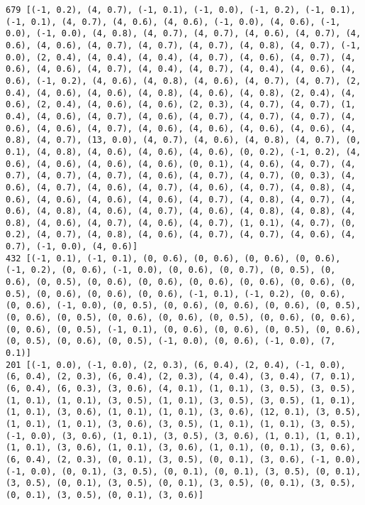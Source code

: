 \documentclass[11pt]{article}
\begin{document}
\begin{Verbatim}[commandchars=\\\{\}]
679 [(-1, 0.2), (4, 0.7), (-1, 0.1), (-1, 0.0), (-1, 0.2), (-1, 0.1), (-1, 0.1), (4, 0.7), (4, 0.6), (4, 0.6), (-1, 0.0), (4, 0.6), (-1, 0.0), (-1, 0.0), (4, 0.8), (4, 0.7), (4, 0.7), (4, 0.6), (4, 0.7), (4, 0.6), (4, 0.6), (4, 0.7), (4, 0.7), (4, 0.7), (4, 0.8), (4, 0.7), (-1, 0.0), (2, 0.4), (4, 0.4), (4, 0.4), (4, 0.7), (4, 0.6), (4, 0.7), (4, 0.6), (4, 0.6), (4, 0.7), (4, 0.4), (4, 0.7), (4, 0.4), (4, 0.6), (4, 0.6), (-1, 0.2), (4, 0.6), (4, 0.8), (4, 0.6), (4, 0.7), (4, 0.7), (2, 0.4), (4, 0.6), (4, 0.6), (4, 0.8), (4, 0.6), (4, 0.8), (2, 0.4), (4, 0.6), (2, 0.4), (4, 0.6), (4, 0.6), (2, 0.3), (4, 0.7), (4, 0.7), (1, 0.4), (4, 0.6), (4, 0.7), (4, 0.6), (4, 0.7), (4, 0.7), (4, 0.7), (4, 0.6), (4, 0.6), (4, 0.7), (4, 0.6), (4, 0.6), (4, 0.6), (4, 0.6), (4, 0.8), (4, 0.7), (13, 0.0), (4, 0.7), (4, 0.6), (4, 0.8), (4, 0.7), (0, 0.1), (4, 0.8), (4, 0.6), (4, 0.6), (4, 0.6), (0, 0.2), (-1, 0.2), (4, 0.6), (4, 0.6), (4, 0.6), (4, 0.6), (0, 0.1), (4, 0.6), (4, 0.7), (4, 0.7), (4, 0.7), (4, 0.7), (4, 0.6), (4, 0.7), (4, 0.7), (0, 0.3), (4, 0.6), (4, 0.7), (4, 0.6), (4, 0.7), (4, 0.6), (4, 0.7), (4, 0.8), (4, 0.6), (4, 0.6), (4, 0.6), (4, 0.6), (4, 0.7), (4, 0.8), (4, 0.7), (4, 0.6), (4, 0.8), (4, 0.6), (4, 0.7), (4, 0.6), (4, 0.8), (4, 0.8), (4, 0.8), (4, 0.6), (4, 0.7), (4, 0.6), (4, 0.7), (1, 0.1), (4, 0.7), (0, 0.2), (4, 0.7), (4, 0.8), (4, 0.6), (4, 0.7), (4, 0.7), (4, 0.6), (4, 0.7), (-1, 0.0), (4, 0.6)]
432 [(-1, 0.1), (-1, 0.1), (0, 0.6), (0, 0.6), (0, 0.6), (0, 0.6), (-1, 0.2), (0, 0.6), (-1, 0.0), (0, 0.6), (0, 0.7), (0, 0.5), (0, 0.6), (0, 0.5), (0, 0.6), (0, 0.6), (0, 0.6), (0, 0.6), (0, 0.6), (0, 0.5), (0, 0.6), (0, 0.6), (0, 0.6), (-1, 0.1), (-1, 0.2), (0, 0.6), (0, 0.6), (-1, 0.0), (0, 0.5), (0, 0.6), (0, 0.6), (0, 0.6), (0, 0.5), (0, 0.6), (0, 0.5), (0, 0.6), (0, 0.6), (0, 0.5), (0, 0.6), (0, 0.6), (0, 0.6), (0, 0.5), (-1, 0.1), (0, 0.6), (0, 0.6), (0, 0.5), (0, 0.6), (0, 0.5), (0, 0.6), (0, 0.5), (-1, 0.0), (0, 0.6), (-1, 0.0), (7, 0.1)]
201 [(-1, 0.0), (-1, 0.0), (2, 0.3), (6, 0.4), (2, 0.4), (-1, 0.0), (6, 0.4), (2, 0.3), (6, 0.4), (2, 0.3), (4, 0.4), (3, 0.4), (7, 0.1), (6, 0.4), (6, 0.3), (3, 0.6), (4, 0.1), (1, 0.1), (3, 0.5), (3, 0.5), (1, 0.1), (1, 0.1), (3, 0.5), (1, 0.1), (3, 0.5), (3, 0.5), (1, 0.1), (1, 0.1), (3, 0.6), (1, 0.1), (1, 0.1), (3, 0.6), (12, 0.1), (3, 0.5), (1, 0.1), (1, 0.1), (3, 0.6), (3, 0.5), (1, 0.1), (1, 0.1), (3, 0.5), (-1, 0.0), (3, 0.6), (1, 0.1), (3, 0.5), (3, 0.6), (1, 0.1), (1, 0.1), (1, 0.1), (3, 0.6), (1, 0.1), (3, 0.6), (1, 0.1), (0, 0.1), (3, 0.6), (6, 0.4), (2, 0.3), (0, 0.1), (3, 0.5), (0, 0.1), (3, 0.6), (-1, 0.0), (-1, 0.0), (0, 0.1), (3, 0.5), (0, 0.1), (0, 0.1), (3, 0.5), (0, 0.1), (3, 0.5), (0, 0.1), (3, 0.5), (0, 0.1), (3, 0.5), (0, 0.1), (3, 0.5), (0, 0.1), (3, 0.5), (0, 0.1), (3, 0.6)]

\end{Verbatim}
\end{document}
